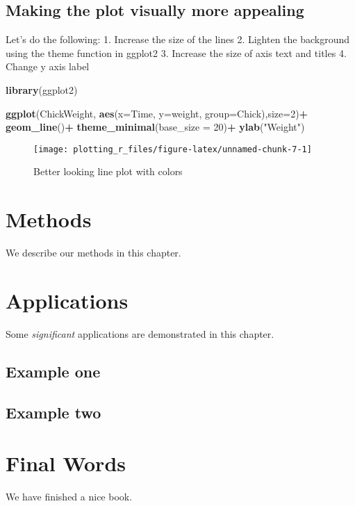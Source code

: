 \documentclass[
]{book}
\newenvironment{Shaded}{\begin{snugshade}}{\end{snugshade}}
\newcommand{\DataTypeTok}[1]{\textcolor[rgb]{0.13,0.29,0.53}{#1}}
\newcommand{\DecValTok}[1]{\textcolor[rgb]{0.00,0.00,0.81}{#1}}
\newcommand{\KeywordTok}[1]{\textcolor[rgb]{0.13,0.29,0.53}{\textbf{#1}}}
\newcommand{\NormalTok}[1]{#1}
\newcommand{\OperatorTok}[1]{\textcolor[rgb]{0.81,0.36,0.00}{\textbf{#1}}}
\newcommand{\StringTok}[1]{\textcolor[rgb]{0.31,0.60,0.02}{#1}}
\begin{document}
\hypertarget{making-the-plot-visually-more-appealing}{%
\section{Making the plot visually more appealing}\label{making-the-plot-visually-more-appealing}}

Let's do the following:
1. Increase the size of the lines
2. Lighten the background using the theme function in ggplot2
3. Increase the size of axis text and titles
4. Change y axis label

\begin{Shaded}
\begin{Highlighting}[]
\KeywordTok{library}\NormalTok{(ggplot2)}

\KeywordTok{ggplot}\NormalTok{(ChickWeight, }\KeywordTok{aes}\NormalTok{(}\DataTypeTok{x=}\NormalTok{Time, }\DataTypeTok{y=}\NormalTok{weight, }\DataTypeTok{group=}\NormalTok{Chick),}\DataTypeTok{size=}\DecValTok{2}\NormalTok{)}\OperatorTok{+}
\StringTok{  }\KeywordTok{geom_line}\NormalTok{()}\OperatorTok{+}
\StringTok{  }\KeywordTok{theme_minimal}\NormalTok{(}\DataTypeTok{base_size =} \DecValTok{20}\NormalTok{)}\OperatorTok{+}
\StringTok{  }\KeywordTok{ylab}\NormalTok{(}\StringTok{"Weight"}\NormalTok{)}
\end{Highlighting}
\end{Shaded}

\begin{figure}

{\centering \texttt{[image: plotting\_r\_files/figure-latex/unnamed-chunk-7-1]} 

}

\caption{Better looking line plot with colors}\label{fig:unnamed-chunk-7}
\end{figure}

\hypertarget{methods}{%
\chapter{Methods}\label{methods}}

We describe our methods in this chapter.

\hypertarget{applications}{%
\chapter{Applications}\label{applications}}

Some \emph{significant} applications are demonstrated in this chapter.

\hypertarget{example-one}{%
\section{Example one}\label{example-one}}

\hypertarget{example-two}{%
\section{Example two}\label{example-two}}

\hypertarget{final-words}{%
\chapter{Final Words}\label{final-words}}

We have finished a nice book.

  
\end{document}
